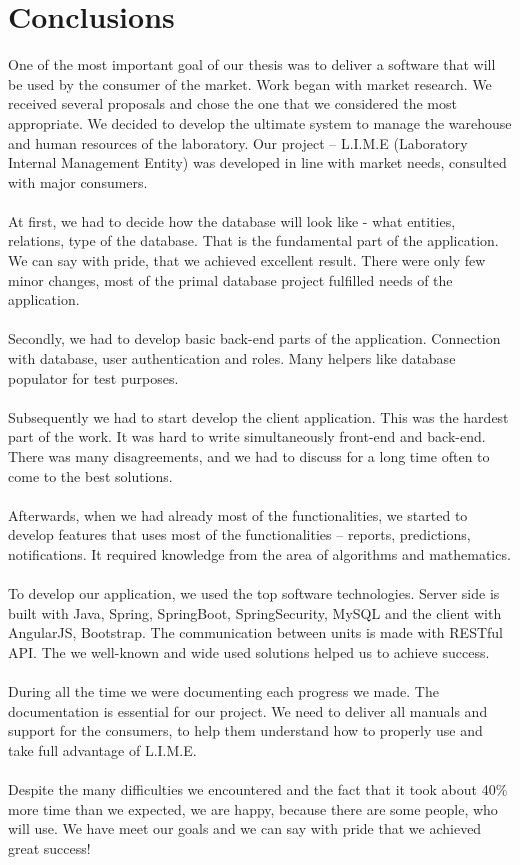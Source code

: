 \documentclass[a4paper,11pt,twoside]{report}
\theoremstyle{definition}
\begin{document}
\chapter*{Conclusions}

One of the most important goal of our thesis was to deliver a software that will be used by the consumer of the market. Work began with market research. We received several proposals and chose the one that we considered the most appropriate. We decided to develop the ultimate system to manage the warehouse and human resources of the laboratory. Our project – L.I.M.E (Laboratory Internal Management Entity) was developed in line with market needs, consulted with major consumers.\\ \\
At first, we had to decide how the database will look like - what entities, relations, type of the database. That is the fundamental part of the application. We can say with pride, that we achieved excellent  result. There were only few minor changes, most of the primal database project fulfilled needs of the application.\\ \\
Secondly, we had to develop basic back-end parts of the application. Connection with database, user authentication and roles. Many helpers like database populator for test purposes.  \\ \\
Subsequently we had to start develop the client application. This was the hardest part of the work. It was hard to write simultaneously front-end and back-end. There was many  disagreements, and we had to discuss for a long time often to come to the best solutions.\\ \\
Afterwards, when we had already most of the functionalities, we started to develop features that uses most of the functionalities – reports, predictions, notifications. It required knowledge from the area of algorithms and mathematics. \\ \\
To develop our application, we used the top software technologies. Server side is built with Java, Spring, SpringBoot, SpringSecurity, MySQL and the client with AngularJS, Bootstrap. The communication between units is made with RESTful API. The we well-known and wide used solutions helped us to achieve success. \\ \\
During all the time we were documenting each progress we made. The documentation is essential for our project. We need to deliver all manuals and support for the consumers, to help them understand how to properly use and take full advantage of L.I.M.E. \\ \\
Despite the many difficulties we encountered and the fact that it took about 40\% more time than we expected, we are happy, because there are some people, who will use. We have meet our goals and we can say with pride that we achieved great success!
\end{document}
